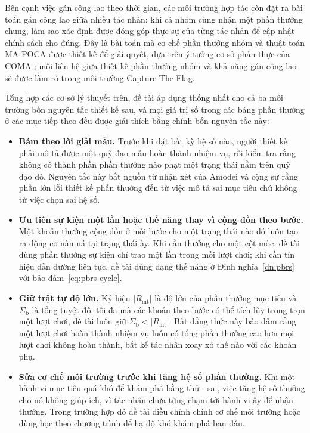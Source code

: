 \indent Bên cạnh việc gán công lao theo thời gian, các môi trường hợp tác còn đặt ra
bài toán gán công lao giữa nhiều tác nhân: khi cả nhóm cùng nhận một phần thưởng
chung, làm sao xác định được đóng góp thực sự của từng tác nhân để cập nhật chính sách
cho đúng. Đây là bài toán mà cơ chế phần thưởng nhóm và thuật toán MA-POCA
\cite{cohen2022mapoca} được thiết kế để giải quyết, dựa trên ý tưởng cơ sở phản thực
của COMA \cite{foerster2018counterfactual}; mối liên hệ giữa thiết kế phần thưởng nhóm
và khả năng gán công lao sẽ được làm rõ trong môi trường Capture The Flag.

\indent Tổng hợp các cơ sở lý thuyết trên, đề tài áp dụng thống nhất cho cả ba môi
trường bốn nguyên tắc thiết kế sau, và mọi giá trị số trong các bảng phần thưởng ở các
mục tiếp theo đều được giải thích bằng chính bốn nguyên tắc này:
\begin{itemize}
    \item \textbf{Bám theo lời giải mẫu.} Trước khi đặt bất kỳ hệ số nào, người thiết
    kế phải mô tả được một quỹ đạo mẫu hoàn thành nhiệm vụ, rồi kiểm tra rằng không có
    thành phần phần thưởng nào phạt một trạng thái nằm trên quỹ đạo đó. Nguyên
    tắc này bắt nguồn từ nhận xét của Amodei và cộng sự \cite{amodei2016concrete} rằng
    phần lớn lỗi thiết kế phần thưởng đến từ việc mô tả sai mục tiêu chứ không từ việc
    chọn sai hệ số.

    \item \textbf{Ưu tiên sự kiện một lần hoặc thế năng thay vì cộng dồn theo bước.}
    Một khoản thưởng cộng dồn ở mỗi bước cho một trạng thái nào đó luôn tạo ra động cơ
    nấn ná tại trạng thái ấy. Khi cần thưởng cho một cột mốc, đề tài dùng phần thưởng
    sự kiện chỉ trao một lần trong mỗi lượt chơi; khi cần tín hiệu dẫn đường liên
    tục, đề tài dùng dạng thế năng ở Định nghĩa~\ref{dn:pbrs} với bảo đảm~\eqref{eq:pbrs-cycle}.

    \item \textbf{Giữ trật tự độ lớn.} Ký hiệu $|R_{\mathrm{mt}}|$ là độ lớn của phần
    thưởng mục tiêu và $\Sigma_{\mathrm{b}}$ là tổng tuyệt đối tối đa mà các khoản theo
    bước có thể tích lũy trong trọn một lượt chơi, đề tài luôn giữ
    $\Sigma_{\mathrm{b}} < |R_{\mathrm{mt}}|$. Bất đẳng thức này bảo đảm rằng một lượt
    chơi hoàn thành nhiệm vụ luôn có tổng phần thưởng cao hơn mọi lượt chơi không hoàn
    thành, bất kể tác nhân xoay xở thế nào với các khoản phụ.

    \item \textbf{Sửa cơ chế môi trường trước khi tăng hệ số phần thưởng.} Khi một hành
    vi mục tiêu quá khó để khám phá bằng thử - sai, việc tăng hệ số thưởng cho nó không
    giúp ích, vì tác nhân chưa từng chạm tới hành vi ấy để nhận thưởng. Trong trường hợp
    đó đề tài điều chỉnh chính cơ chế môi trường hoặc dùng học theo chương trình
    \cite{bengio2009curriculum} để hạ độ khó khám phá ban đầu.
\end{itemize}

